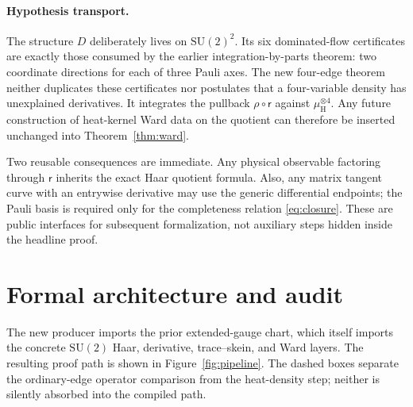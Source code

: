 \documentclass[11pt]{article}
\theoremstyle{definition}
\newcommand{\SU}{\mathrm{SU}(2)}
\newcommand{\Haar}{\mu_{\mathrm H}}
\newcommand{\red}{\mathsf r}
\begin{document}
\paragraph{Hypothesis transport.}
The structure $D$ deliberately lives on $\SU^2$.  Its six dominated-flow
certificates are exactly those consumed by the earlier integration-by-parts
theorem: two coordinate directions for each of three Pauli axes.  The new
four-edge theorem neither duplicates these certificates nor postulates that
a four-variable density has unexplained derivatives.  It integrates the
pullback $\rho\circ\red$ against $\Haar^{\otimes4}$.  Any future construction
of heat-kernel Ward data on the quotient can therefore be inserted unchanged
into Theorem~\ref{thm:ward}.

Two reusable consequences are immediate.  Any physical observable factoring
through $\red$ inherits the exact Haar quotient formula.  Also, any matrix
tangent curve with an entrywise derivative may use the generic differential
endpoints; the Pauli basis is required only for the completeness relation
\eqref{eq:closure}.  These are public interfaces for subsequent
formalization, not auxiliary steps hidden inside the headline proof.

\section{Formal architecture and audit}

The new producer imports the prior extended-gauge chart, which itself imports
the concrete $\SU$ Haar, derivative, trace--skein, and Ward layers.  The
resulting proof path is shown in Figure~\ref{fig:pipeline}.  The dashed boxes
separate the ordinary-edge operator comparison from the heat-density step;
neither is silently absorbed into the compiled path.
\end{document}
